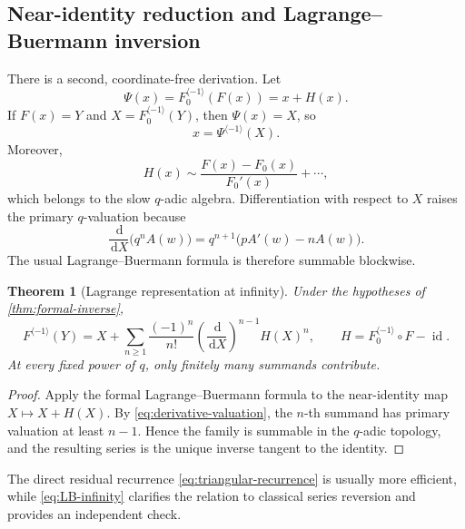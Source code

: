 \documentclass[11pt,a4paper]{article}
\numberwithin{equation}{section}
\newtheorem{theorem}{Theorem}[section]
\theoremstyle{definition}
\theoremstyle{remark}
\newcommand{\dd}{\,\mathrm d}
\newcommand{\cinv}{\langle-1\rangle}
\begin{document}
\subsection{Near-identity reduction and Lagrange--Buermann inversion}

There is a second, coordinate-free derivation.  Let
\begin{equation}
 \Psi(x)=F_0^{\cinv}(F(x))=x+H(x).
 \label{eq:Psi-near-id}
\end{equation}
If \(F(x)=Y\) and \(X=F_0^{\cinv}(Y)\), then \(\Psi(x)=X\), so
\begin{equation}
 x=\Psi^{\cinv}(X).
 \label{eq:Psi-inverse}
\end{equation}
Moreover,
\begin{equation}
 H(x)\sim\frac{F(x)-F_0(x)}{F_0'(x)}+\cdots,
 \label{eq:H-leading}
\end{equation}
which belongs to the slow \(q\)-adic algebra.  Differentiation with respect
to \(X\) raises the primary \(q\)-valuation because
\begin{equation}
 \frac{\dd}{\dd X}\bigl(q^nA(w)\bigr)
 =q^{n+1}\bigl(pA'(w)-nA(w)\bigr).
 \label{eq:derivative-valuation}
\end{equation}
The usual Lagrange--Buermann formula is therefore summable blockwise.

\begin{theorem}[Lagrange representation at infinity]\label{thm:LB-infinity}
Under the hypotheses of \cref{thm:formal-inverse},
\begin{equation}
 F^{\cinv}(Y)=X+
 \sum_{n\ge1}\frac{(-1)^n}{n!}
 \left(\frac{\dd}{\dd X}\right)^{n-1}H(X)^n,
 \qquad H=F_0^{\cinv}\!\circ F-\operatorname{id}.
 \label{eq:LB-infinity}
\end{equation}
At every fixed power of \(q\), only finitely many summands contribute.
\end{theorem}

\begin{proof}
Apply the formal Lagrange--Buermann formula to the near-identity map
\(X\mapsto X+H(X)\).  By \cref{eq:derivative-valuation}, the \(n\)-th
summand has primary valuation at least \(n-1\).  Hence the family is
summable in the \(q\)-adic topology, and the resulting series is the unique
inverse tangent to the identity.
\end{proof}

The direct residual recurrence \cref{eq:triangular-recurrence} is usually
more efficient, while \cref{eq:LB-infinity} clarifies the relation to
classical series reversion and provides an independent check.
\end{document}
